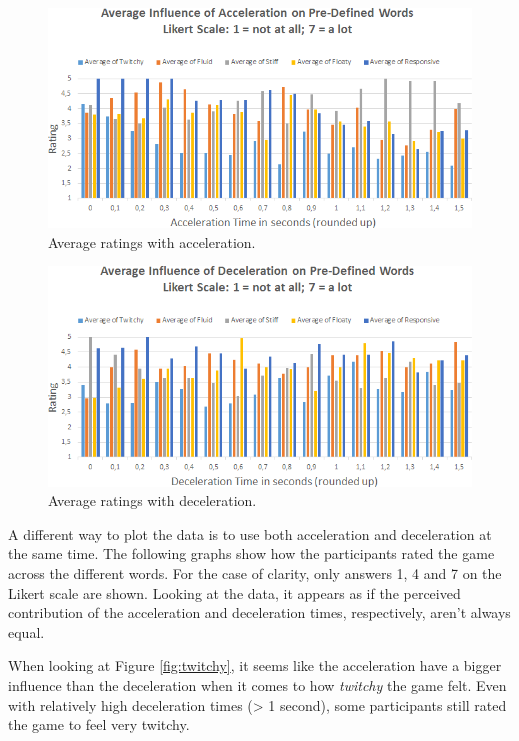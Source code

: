 \begin{figure}[htbp]
\centering
\includegraphics[width=0.97\columnwidth]{Pics/acc_average_response}
\caption{Average ratings with acceleration.}
\label{fig:acc_average_response}
\end{figure}

\begin{figure}[htbp]
\centering
\includegraphics[width=0.97\columnwidth]{Pics/dec_average_response}
\caption{Average ratings with deceleration.}
\label{fig:dec_average_response}
\end{figure}

A different way to plot the data is to use both acceleration and deceleration at the same time. The following graphs show how the participants rated the game across the different words. For the case of clarity, only answers 1, 4 and 7 on the Likert scale are shown. Looking at the data, it appears as if the perceived contribution of the acceleration and deceleration times, respectively, aren't always equal.

When looking at Figure \ref{fig:twitchy}, it seems like the acceleration have a bigger influence than the deceleration when it comes to how \textit{twitchy} the game felt. Even with relatively high deceleration times (> 1 second), some participants still rated the game to feel very twitchy.


